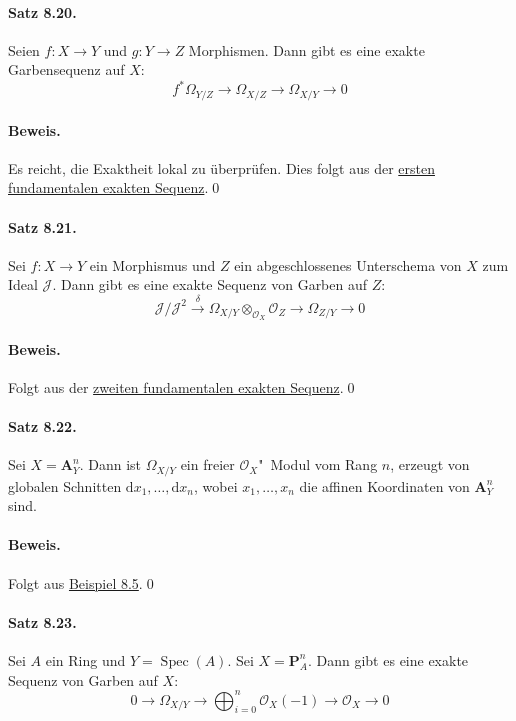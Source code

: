 \paragraph{Satz 8.20.}\label{8.20} Seien $f:X\to Y$ und $g:Y\to Z$ Morphismen. Dann gibt es eine exakte Garbensequenz auf $X$:
\[f^\ast\Omega_{Y/Z}\longrightarrow\Omega_{X/Z}\longrightarrow\Omega_{X/Y}\longrightarrow 0 \]

\paragraph{Beweis.} Es reicht, die Exaktheit lokal zu überprüfen. Dies folgt aus der \hyperref[8.7]{ersten fundamentalen exakten Sequenz}.\qed

\paragraph{Satz 8.21.}\label{8.21} Sei $f:X\to Y$ ein Morphismus und $Z$ ein abgeschlossenes Unterschema von $X$ zum Ideal $\mathcal{J}$. Dann gibt es eine exakte Sequenz von Garben auf $Z$:
\[\mathcal{J}/\mathcal{J}^2 \stackrel{\delta}{\longrightarrow} \Omega_{X/Y}\otimes_{\mathcal{O}_X}\mathcal{O}_Z\longrightarrow\Omega_{Z/Y}\longrightarrow 0 \]

\paragraph{Beweis.} Folgt aus der \hyperref[8.9]{zweiten fundamentalen exakten Sequenz}.\qed

\paragraph{Satz 8.22.}\label{8.22} Sei $X=\mathbf{A}_Y^n$. Dann ist $\Omega_{X/Y}$ ein freier $\mathcal{O}_X$"~Modul vom Rang $n$, erzeugt von globalen Schnitten $\mathrm{d}x_1,\ldots,\mathrm{d}x_n$, wobei $x_1,\ldots,x_n$ die affinen Koordinaten von $\mathbf{A}_Y^n$ sind.

\paragraph{Beweis.} Folgt aus \hyperref[8.5]{Beispiel 8.5}.\qed

\paragraph{Satz 8.23.}\label{8.23} Sei $A$ ein Ring und $Y=\operatorname{Spec}(A)$. Sei $X=\mathbf{P}_A^n$. Dann gibt es eine exakte Sequenz von Garben auf $X$:
\[0\longrightarrow\Omega_{X/Y}\longrightarrow \bigoplus_{i=0}^n\mathcal{O}_X(-1)\longrightarrow \mathcal{O}_X\longrightarrow 0 \]

